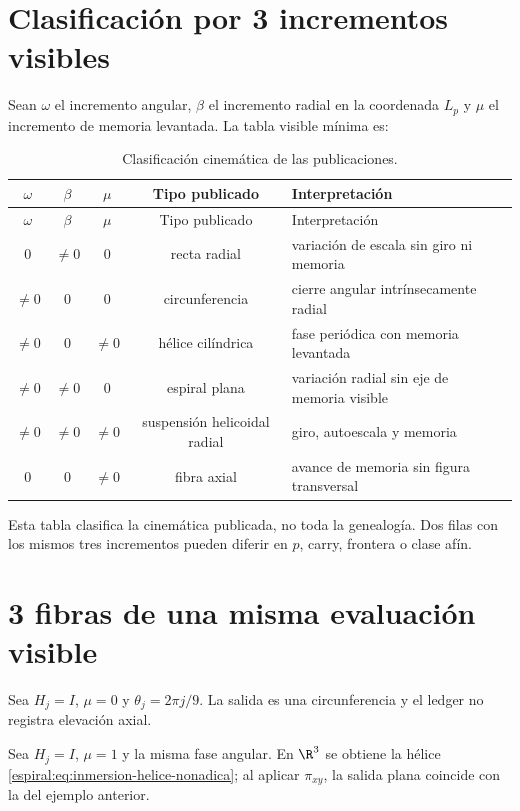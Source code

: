 \section{Clasificación por 3 incrementos visibles}

Sean \(\omega\) el incremento angular, \(\beta\) el incremento radial en
la coordenada \(L_p\) y \(\mu\) el incremento de memoria levantada. La tabla
visible mínima es:
\begin{longtable}{ccccp{}}
\caption{Clasificación cinemática de las publicaciones.}
\label{espiral:tab:clasificacion-cinematica}\\
\toprule
\(\omega\)&\(\beta\)&\(\mu\)&Tipo publicado&Interpretación\\
\midrule
\endfirsthead
\toprule
\(\omega\)&\(\beta\)&\(\mu\)&Tipo publicado&Interpretación\\
\midrule
\endhead
0&\(\neq0\)&0&recta radial&variación de escala sin giro ni memoria\\
\(\neq0\)&0&0&circunferencia&cierre angular intrínsecamente radial\\
\(\neq0\)&0&\(\neq0\)&hélice cilíndrica&fase periódica con memoria levantada\\
\(\neq0\)&\(\neq0\)&0&espiral plana&variación radial sin eje de memoria visible\\
\(\neq0\)&\(\neq0\)&\(\neq0\)&suspensión helicoidal radial&giro, autoescala y memoria\\
0&0&\(\neq0\)&fibra axial&avance de memoria sin figura transversal\\
\bottomrule
\end{longtable}

Esta tabla clasifica la cinemática publicada, no toda la genealogía. Dos
filas con los mismos tres incrementos pueden diferir en \(p\), carry,
frontera o clase afín.

\section{3 fibras de una misma evaluación visible}

\begin{example}
Sea \(H_j=I\), \(\mu=0\) y \(\theta_j=2\pi j/9\). La salida es una
circunferencia y el ledger no registra elevación axial.
\end{example}

\begin{example}
Sea \(H_j=I\), \(\mu=1\) y la misma fase angular. En \(\R^3\) se obtiene la
hélice \cref{espiral:eq:inmersion-helice-nonadica}; al aplicar \(\pi_{xy}\), la
salida plana coincide con la del ejemplo anterior.
\end{example}

